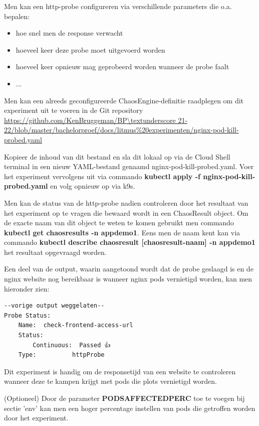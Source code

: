 Men kan een http-probe configureren via verschillende parameters die o.a. bepalen:
\begin{itemize}
    \item hoe snel men de response verwacht
    \item hoeveel keer deze probe moet uitgevoerd worden
    \item hoeveel keer opnieuw mag geprobeerd worden wanneer de probe faalt
    \item ...
\end{itemize}

Men kan een alreeds geconfigureerde ChaosEngine-definitie raadplegen om dit experiment uit te voeren in de Git repository \url{https://github.com/KenBruggeman/BP\textunderscore 21-22/blob/master/bachelorproef/docs/litmus%20experimenten/nginx-pod-kill-probed.yaml}
    
Kopieer de inhoud van dit bestand en sla dit lokaal op via de Cloud Shell terminal in een nieuw YAML-bestand genaamd nginx-pod-kill-probed.yaml. Voer het experiment vervolgens uit via commando {\bf kubectl apply -f nginx-pod-kill-probed.yaml} en volg opnieuw op via k9s. 

Men kan de status van de http-probe nadien controleren door het resultaat van het experiment op te vragen die bewaard wordt in een ChaosResult object. Om de exacte naam van dit object te weten te komen gebruikt men commando {\bf kubectl get chaosresults -n appdemo1}. \newline Eens men de naam kent kan via commando {\bf kubectl describe chaosresult [chaosresult-naam] -n appdemo1} het resultaat opgevraagd worden.

Een deel van de output, waarin aangetoond wordt dat de probe geslaagd is en de nginx website nog bereikbaar is wanneer nginx pods vernietigd worden, kan men hieronder zien: 
\begin{lstlisting}
--vorige output weggelaten--    
Probe Status:
    Name:  check-frontend-access-url
    Status:
        Continuous:  Passed 👍   
    Type:          httpProbe
\end{lstlisting}

Dit experiment is handig om de responsetijd van een website te controleren wanneer deze te kampen krijgt met pods die plots vernietigd worden. 

(Optioneel) Door de parameter {\bf PODS\textunderscore AFFECTED\textunderscore PERC} toe te voegen bij sectie 'env' kan men een hoger percentage instellen van pods die getroffen worden door het experiment.
